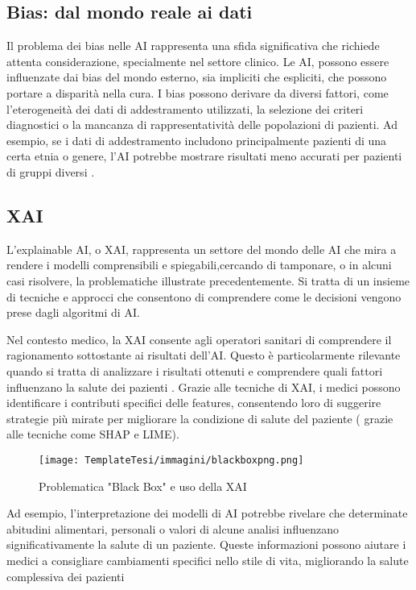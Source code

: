 \subsection{Bias: dal mondo reale ai dati}

Il problema dei bias nelle AI rappresenta una sfida significativa che richiede attenta considerazione, specialmente nel settore clinico. 
Le AI, possono essere influenzate dai bias del mondo esterno, sia impliciti che espliciti, che possono portare a disparità nella cura. I bias possono derivare da diversi fattori, come l'eterogeneità dei dati di addestramento utilizzati, la selezione dei criteri diagnostici o la mancanza di rappresentatività delle popolazioni di pazienti. Ad esempio, se i dati di addestramento includono principalmente pazienti di una certa etnia o genere, l'AI potrebbe mostrare risultati meno accurati per pazienti di gruppi diversi \cite{MITbias}.
\begin{flushleft}

\subsection{XAI}



L'explainable AI, o XAI, rappresenta un settore del mondo delle AI che mira a rendere i modelli comprensibili e spiegabili,cercando di tamponare, o in alcuni casi risolvere, la problematiche illustrate precedentemente. 
Si tratta di un insieme di tecniche e approcci che consentono di comprendere come le decisioni vengono prese dagli algoritmi di AI.


Nel contesto medico, la XAI  consente agli operatori sanitari di comprendere il ragionamento sottostante ai risultati dell'AI. Questo è particolarmente rilevante quando si tratta di analizzare i risultati ottenuti e comprendere quali fattori influenzano la salute dei pazienti \cite{XAIdoctors}. 
Grazie alle tecniche di XAI, i medici possono identificare i contributi specifici delle features, consentendo loro di suggerire strategie più mirate per migliorare la condizione di salute del paziente ( grazie alle tecniche come SHAP e LIME). 
\begin{figure}[H]
    \centering
    \texttt{[image: TemplateTesi/immagini/blackboxpng.png]}
    \caption{Problematica "Black Box" e uso della XAI \cite{imm_blackbox} }
    \label{fig:bb}
\end{figure}
Ad esempio, l'interpretazione dei modelli di AI potrebbe rivelare che determinate abitudini alimentari, personali o valori di alcune analisi influenzano significativamente la salute di un paziente. 
Queste informazioni possono aiutare i medici a consigliare cambiamenti specifici nello stile di vita, migliorando la salute complessiva dei pazienti



\end{flushleft}


